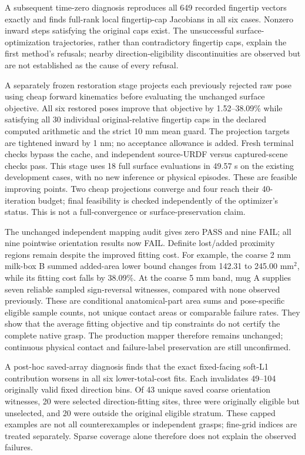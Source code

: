 A subsequent time-zero diagnosis reproduces all 649 recorded fingertip vectors
exactly and finds full-rank local fingertip-cap Jacobians in all six cases.
Nonzero inward steps satisfying the original caps exist. The unsuccessful
surface-optimization trajectories, rather than contradictory fingertip caps,
explain the first method's refusals; nearby direction-eligibility discontinuities
are observed but are not established as the cause of every refusal.

A separately frozen restoration stage projects each previously rejected raw
pose using cheap forward kinematics before evaluating the unchanged surface
objective. All six restored poses improve that objective by 1.52--38.09\% while
satisfying all 30 individual original-relative fingertip caps in the declared
computed arithmetic and the strict 10 mm mean guard. The projection targets
are tightened inward by 1 nm; no acceptance allowance is added. Fresh terminal
checks bypass the cache, and independent source-URDF versus captured-scene
checks pass. This stage uses 18 full surface evaluations in 49.57 s on the
existing development cases, with no new inference or physical episodes. These
are feasible improving points. Two cheap projections converge and four reach
their 40-iteration budget; final feasibility is checked independently of the
optimizer's status. This is not a full-convergence or surface-preservation claim.

The unchanged independent mapping audit gives zero PASS and nine FAIL; all
nine pointwise orientation results now FAIL. Definite lost/added proximity
regions remain despite the improved fitting cost. For example, the coarse
2 mm milk-box B summed added-area lower bound changes from 142.31 to
245.00 mm$^2$, while its fitting cost falls by 38.09\%. At the coarse 5 mm
band, mug A supplies seven reliable sampled sign-reversal witnesses, compared
with none observed previously. These are conditional anatomical-part area
sums and pose-specific eligible sample counts, not unique contact areas or
comparable failure rates. They show that the average fitting objective and
tip constraints do not certify the complete native grasp. The production
mapper therefore remains unchanged; continuous physical contact and
failure-label preservation are still unconfirmed.

A post-hoc saved-array diagnosis finds that the exact fixed-facing soft-L1
contribution worsens in all six lower-total-cost fits. Each invalidates
49--104 originally valid fixed direction bins. Of 43 unique saved coarse
orientation witnesses, 20 were selected direction-fitting sites, three were
originally eligible but unselected, and 20 were outside the original eligible
stratum. These capped examples are not all counterexamples or independent
grasps; fine-grid indices are treated separately. Sparse coverage alone
therefore does not explain the observed failures.


